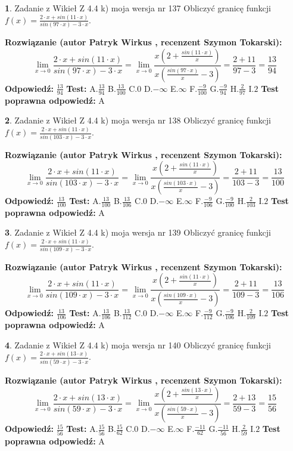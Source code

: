 \documentclass[12pt, a4paper]{article}
\theoremstyle{definition} %
\newtheorem{zad}{}
\newcommand{\zadStart}[1]{\begin{zad}#1\newline}
\newcommand{\zadStop}{\end{zad}}
\newcommand{\rozwStart}[2]{\noindent \textbf{Rozwiązanie (autor #1 , recenzent #2): }\newline}
\newcommand{\rozwStop}{\newline}
\newcommand{\odpStart}{\noindent \textbf{Odpowiedź:}\newline}
\newcommand{\odpStop}{\newline}
\newcommand{\testStart}{\noindent \textbf{Test:}\newline}
\newcommand{\testStop}{\newline}
\newcommand{\kluczStart}{\noindent \textbf{Test poprawna odpowiedź:}\newline}
\newcommand{\kluczStop}{\newline}
\begin{document}
\zadStart{Zadanie z Wikieł Z 4.4 k) moja wersja nr 137}
Obliczyć granicę funkcji $f(x)=\frac{2\cdot x +sin(11\cdot x)}{sin(97\cdot x) -3\cdot x}$.
\zadStop
\rozwStart{Patryk Wirkus}{Szymon Tokarski}
$$\lim\limits_{x\to 0}\frac{2\cdot x +sin(11\cdot x)}{sin(97\cdot x) -3\cdot x}
=\lim\limits_{x\to 0}\frac{x(2+\frac{sin(11\cdot x)}{x})}{x(\frac{sin(97\cdot x)}{x}-3)}
=\frac{2+11}{97-3} = \frac{13}{94}$$
\rozwStop
\odpStart
$\frac{13}{94}$
\odpStop
\testStart
A.$\frac{13}{94}$
B.$\frac{13}{100}$
C.$0$
D.$-\infty$
E.$\infty$
F.$\frac{-9}{100}$
G.$\frac{-9}{94}$
H.$\frac{2}{97}$
I.$2$
\testStop
\kluczStart
A
\kluczStop



\zadStart{Zadanie z Wikieł Z 4.4 k) moja wersja nr 138}
Obliczyć granicę funkcji $f(x)=\frac{2\cdot x +sin(11\cdot x)}{sin(103\cdot x) -3\cdot x}$.
\zadStop
\rozwStart{Patryk Wirkus}{Szymon Tokarski}
$$\lim\limits_{x\to 0}\frac{2\cdot x +sin(11\cdot x)}{sin(103\cdot x) -3\cdot x}
=\lim\limits_{x\to 0}\frac{x(2+\frac{sin(11\cdot x)}{x})}{x(\frac{sin(103\cdot x)}{x}-3)}
=\frac{2+11}{103-3} = \frac{13}{100}$$
\rozwStop
\odpStart
$\frac{13}{100}$
\odpStop
\testStart
A.$\frac{13}{100}$
B.$\frac{13}{106}$
C.$0$
D.$-\infty$
E.$\infty$
F.$\frac{-9}{106}$
G.$\frac{-9}{100}$
H.$\frac{2}{103}$
I.$2$
\testStop
\kluczStart
A
\kluczStop



\zadStart{Zadanie z Wikieł Z 4.4 k) moja wersja nr 139}
Obliczyć granicę funkcji $f(x)=\frac{2\cdot x +sin(11\cdot x)}{sin(109\cdot x) -3\cdot x}$.
\zadStop
\rozwStart{Patryk Wirkus}{Szymon Tokarski}
$$\lim\limits_{x\to 0}\frac{2\cdot x +sin(11\cdot x)}{sin(109\cdot x) -3\cdot x}
=\lim\limits_{x\to 0}\frac{x(2+\frac{sin(11\cdot x)}{x})}{x(\frac{sin(109\cdot x)}{x}-3)}
=\frac{2+11}{109-3} = \frac{13}{106}$$
\rozwStop
\odpStart
$\frac{13}{106}$
\odpStop
\testStart
A.$\frac{13}{106}$
B.$\frac{13}{112}$
C.$0$
D.$-\infty$
E.$\infty$
F.$\frac{-9}{112}$
G.$\frac{-9}{106}$
H.$\frac{2}{109}$
I.$2$
\testStop
\kluczStart
A
\kluczStop



\zadStart{Zadanie z Wikieł Z 4.4 k) moja wersja nr 140}
Obliczyć granicę funkcji $f(x)=\frac{2\cdot x +sin(13\cdot x)}{sin(59\cdot x) -3\cdot x}$.
\zadStop
\rozwStart{Patryk Wirkus}{Szymon Tokarski}
$$\lim\limits_{x\to 0}\frac{2\cdot x +sin(13\cdot x)}{sin(59\cdot x) -3\cdot x}
=\lim\limits_{x\to 0}\frac{x(2+\frac{sin(13\cdot x)}{x})}{x(\frac{sin(59\cdot x)}{x}-3)}
=\frac{2+13}{59-3} = \frac{15}{56}$$
\rozwStop
\odpStart
$\frac{15}{56}$
\odpStop
\testStart
A.$\frac{15}{56}$
B.$\frac{15}{62}$
C.$0$
D.$-\infty$
E.$\infty$
F.$\frac{-11}{62}$
G.$\frac{-11}{56}$
H.$\frac{2}{59}$
I.$2$
\testStop
\kluczStart
A
\kluczStop
\end{document}
